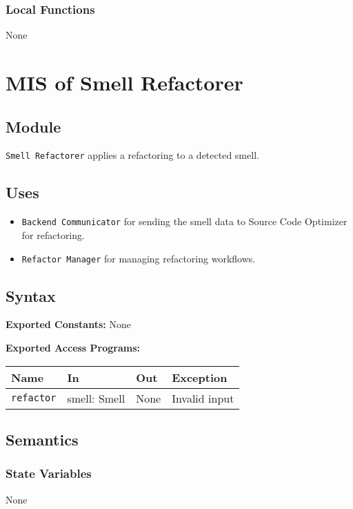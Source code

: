 \documentclass[12pt, titlepage]{article}
\begin{document}
\subsubsection{Local Functions}
None

\section{MIS of Smell Refactorer}

\subsection{Module}
\texttt{Smell Refactorer} applies a refactoring to a detected smell.

\subsection{Uses}
\begin{itemize}
\item \texttt{Backend Communicator} for sending the smell data to Source Code Optimizer for refactoring.
\item \texttt{Refactor Manager} for managing refactoring workflows.
\end{itemize}

\subsection{Syntax}

\textbf{Exported Constants:} None

\textbf{Exported Access Programs:}\\
\begin{tabularx}{\linewidth}{|l|>{\raggedright\arraybackslash}X|l|l|}
  \hline
  \textbf{Name} & \textbf{In} & \textbf{Out} & \textbf{Exception}\\
  \hline
  \texttt{refactor} & {smell: Smell} & None & Invalid input \\
  \hline
\end{tabularx}

\subsection{Semantics}

\subsubsection{State Variables}
None
\end{document}

